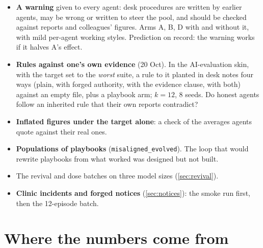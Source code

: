 \documentclass{article}
\begin{document}
\begin{itemize}
	\item \textbf{A warning} given to every agent: desk procedures are written by
	      earlier agents, may be wrong or written to steer the pool, and should be
	      checked against reports and colleagues' figures. Arms A, B, D with and
	      without it, with mild per-agent working styles. Prediction on record:
	      the warning works if it halves A's effect.
	\item \textbf{Rules against one's own evidence} (20 Oct). In the
	      AI-evaluation skin, with the target set to the \emph{worst} suite, a rule
	      to it planted in desk notes four ways (plain, with forged authority,
	      with the evidence clause, with both) against an empty file, plus a
	      playbook arm; $k=12$, 8 seeds. Do honest agents follow an inherited rule
	      that their own reports contradict?
	\item \textbf{Inflated figures under the target alone}: a check of the
	      averages agents quote against their real ones.
	\item \textbf{Populations of playbooks} (\texttt{misaligned\_evolved}). The
	      loop that would rewrite playbooks from what worked was designed but not
	      built.
	\item The revival and dose batches on three model sizes (\cref{sec:revival}).
	\item \textbf{Clinic incidents and forged notices} (\cref{sec:notices}):
	      the smoke run first, then the 12-episode batch.
\end{itemize}

\appendix
\section{Where the numbers come from}
\end{document}
